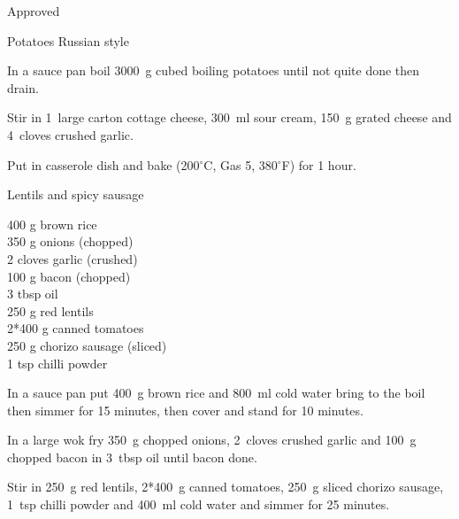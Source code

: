 \begin{menu}{Approved}
\begin{recipe}{2}{Potatoes Russian style}
\begin{ingredients}
		\end{ingredients}
	
	
    \begin{instructions}
    \item 
        In a sauce pan boil
        3000~g cubed boiling potatoes
        until not quite done
        then drain.
      \item 
        Stir in
        1~large carton  cottage cheese,
        300~ml  sour cream,
        150~g grated cheese
        and
        4~cloves crushed garlic.
      \item 
        Put in casserole dish and bake 
      (200$^{\circ}$C, Gas 5, 380$^{\circ}$F)
     for 1 hour.
      
    \end{instructions}
    \end{recipe}%
  
    \begin{recipe}{2}{Lentils and spicy sausage}%
    
		\begin{ingredients}
		400 g brown rice  \\
	350 g onions (chopped) \\
	2 cloves garlic (crushed) \\
	100 g bacon (chopped) \\
	3 tbsp oil  \\
	250 g red lentils  \\
	2*400 g canned tomatoes  \\
	250 g chorizo sausage (sliced) \\
	1 tsp chilli powder  \\
	
		\end{ingredients}
	
    \begin{instructions}
    \item 
      In a
      sauce pan
      put
      400~g  brown rice
      and
      800~ml  cold water
      bring to the boil then simmer for 15 minutes,
      then cover and stand for 10 minutes.
    \item 
        In a large wok fry
        350~g chopped onions,
        2~cloves crushed garlic
        and
        100~g chopped bacon
        in
        3~tbsp  oil
        until bacon done.
      \item 
        Stir in
        250~g  red lentils,
        2*400~g  canned tomatoes,
        250~g sliced chorizo sausage,
        1~tsp  chilli powder
        and
        400~ml  cold water
        and simmer for 25 minutes.
      

\end{instructions}
\end{recipe}
\end{menu}
